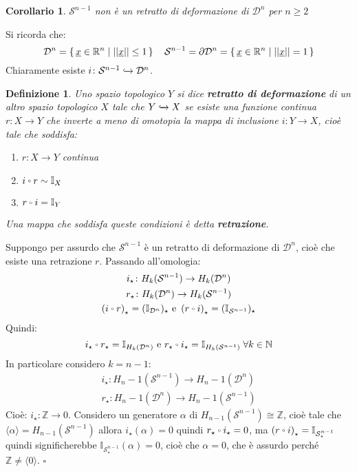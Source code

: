 \documentclass[10pt, twoside=false, x11names]{scrbook}
\newtheorem{corollary}[theorem]{Corollario}
\newtheorem{definition}[theorem]{Definizione}
\newenvironment{proof}{{\textbf{Dimostrazione}:}}{\hfill $\square$}
\newcommand{\Z}{\mathbb{Z}}
\newcommand{\RN}[1][]{\mathbb{R}^#1}
\newcommand{\Id}[1][]{\mathbb{I}_#1}
\newcommand{\Sph}[1][]{\mathcal{S}^#1}
\newcommand{\Disk}[1][]{\mathcal{D}^#1}
\newcommand{\incl}{\xhookrightarrow{}}
\renewcommand{\vec}[1]{\underline{#1}}
\let\latexcirc=\circ
\newcommand{\ccirc}{\mathbin{\mathchoice
  {\xcirc\scriptstyle}
  {\xcirc\scriptstyle}
  {\xcirc\scriptscriptstyle}
  {\xcirc\scriptscriptstyle}
}}
\newcommand{\xcirc}[1]{\vcenter{\hbox{$#1\latexcirc$}}}
\let\circ\ccirc
\begin{document}
\begin{corollary}
  $ \Sph{n-1} $ non è un retratto di deformazione di $ \Disk{n} $ per $ n \geq 2 $
\end{corollary}
\begin{proof}
  Si ricorda che:
  \[
    \Disk{n} = \set{ \vec{x} \in \RN{n} | || \vec{x} || \leq 1} \quad \Sph{n-1} = \partial \Disk{n} = \set{ \vec{x} \in \RN{n} | || \vec{x} || = 1}
  \]
  Chiaramente esiste $ i \colon \Sph{n-1} \incl \Disk{n} $.
  \begin{definition}
    Uno spazio topologico $ Y $ si dice \textbf{retratto di deformazione} di un altro
    spazio topologico $ X $ tale che $ Y \incl X $ se esiste una funzione continua $ r\colon X \to Y $ che inverte a meno di omotopia
    la mappa di inclusione $ i\colon Y \to X $, cioè tale che soddisfa:
    \begin{enumerate}
    \item $ r\colon X \to Y $ continua
    \item $ i \circ r \sim \Id{X} $
    \item $ r \circ i = \Id{Y} $
    \end{enumerate}
    Una mappa che soddisfa queste condizioni è detta \textbf{retrazione}.
  \end{definition}
  Suppongo per assurdo che $ \Sph{n-1} $ è un retratto di deformazione di $ \Disk{n} $, cioè che
  esiste una retrazione $ r $. Passando all'omologia:
  \begin{gather*}
    i_\star \colon H_k(\Sph{n-1}) \to H_k(\Disk{n}) \\
    r_\star \colon H_k(\Disk{n}) \to H_k(\Sph{n-1}) \\
    \left( i \circ r \right)_\star = (\Id{\Disk{n}})_\star \text{ e }  \left( r \circ i \right)_\star = (\Id{\Sph{n-1}})_\star
  \end{gather*}
  Quindi:
  \[
    i_\star \circ r_\star = \Id{H_k(\Disk{n})} \text{ e } r_\star \circ i_\star = \Id{H_k(\Sph{n-1})} \; \forall k \in \mathbb{N}
  \]
  In particolare considero $ k = n - 1 $:
  \begin{gather*}
    i_\star \colon H_n-1(\Sph{n-1}) \to H_n-1(\Disk{n}) \\
    r_\star \colon H_n-1(\Disk{n}) \to H_n-1(\Sph{n-1})
  \end{gather*}
  Cioè: $ i_\star \colon \Z \to 0 $. Considero un generatore $ \alpha $ di $ H_{n-1}(\Sph{n-1}) \cong \Z $, cioè tale
  che $ \langle\alpha\rangle = H_{n-1}(\Sph{n-1}) $ allora $ i_\star(\alpha) = 0 $ quindi $ r_\star \circ i_\star = 0 $, ma
  $ \left( r \circ i \right)_\star = \Id{\Sph{n-1}_\star} $ quindi significherebbe $ \Id{\Sph{n-1}_\star}(\alpha) = 0 $,
  cioè che $ \alpha = 0 $, che è assurdo perché $ \Z \not = \langle0\rangle $.
\end{proof}
\end{document}
